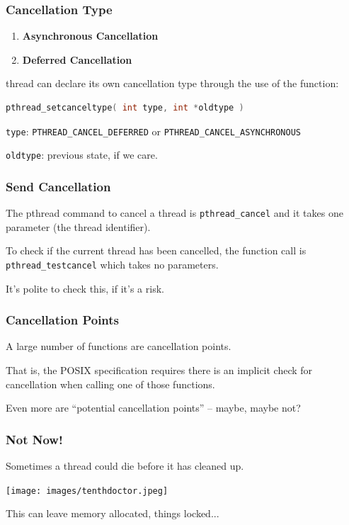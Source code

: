 \begin{frame}[fragile]
	\frametitle{Cancellation Type}

	\begin{enumerate}
		\item \textbf{Asynchronous Cancellation}
		\item \textbf{Deferred Cancellation}
	\end{enumerate}

	thread can declare its own cancellation type through the use of the function:
	\begin{lstlisting}[language=C]
pthread_setcanceltype( int type, int *oldtype )
\end{lstlisting}

	\texttt{type}: \texttt{PTHREAD\_CANCEL\_DEFERRED} or \texttt{PTHREAD\_CANCEL\_ASYNCHRONOUS}

	\texttt{oldtype}: previous state, if we care.

\end{frame}

\begin{frame}
	\frametitle{Send Cancellation}

	The pthread command to cancel a thread is \texttt{pthread\_cancel} and it takes one parameter (the thread identifier).

	To check if the current thread has been cancelled, the function call is \texttt{pthread\_testcancel} which takes no parameters.

	It's polite to check this, if it's a risk.

\end{frame}


\begin{frame}
	\frametitle{Cancellation Points}
	A  large number of functions are \alert{cancellation points}.

	That is, the POSIX specification requires there is an implicit check for cancellation when calling one of those functions.

	Even more are ``potential cancellation points'' -- maybe, maybe not?

\end{frame}



\begin{frame}
	\frametitle{Not Now!}
	Sometimes a thread could die before it has cleaned up.

	\begin{center}
		\texttt{[image: images/tenthdoctor.jpeg]}
	\end{center}

	This can leave memory allocated, things locked...

\end{frame}


